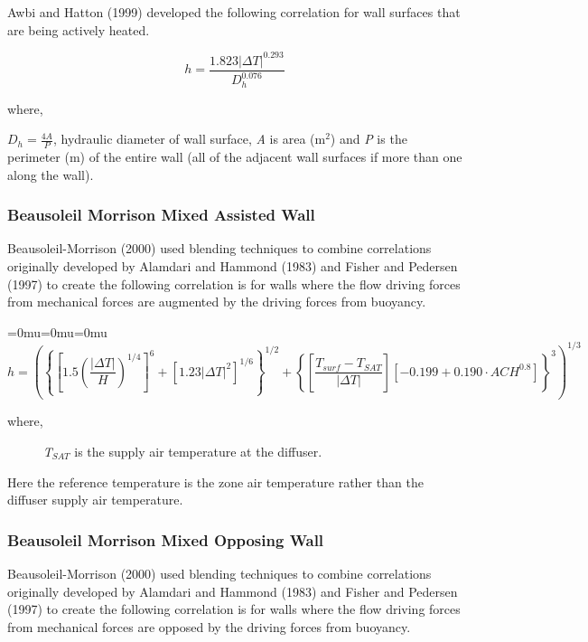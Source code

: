 Awbi and Hatton (1999) developed the following correlation for wall surfaces that are being actively heated.

\begin{equation}
h = \frac{{1.823{{\left| {\Delta T} \right|}^{0.293}}}}{{D_h^{0.076}}}
\end{equation}

where,

\({D_h} = \frac{{4A}}{P}\), hydraulic diameter of wall surface, \emph{A} is area (m\(^{2}\)) and \emph{P} is the perimeter (m) of the entire wall (all of the adjacent wall surfaces if more than one along the wall).

\subsubsection{Beausoleil Morrison Mixed Assisted Wall}\label{beausoleil-morrison-mixed-assisted-wall}

Beausoleil-Morrison (2000) used blending techniques to combine correlations originally developed by Alamdari and Hammond (1983) and Fisher and Pedersen (1997) to create the following correlation is for walls where the flow driving forces from mechanical forces are augmented by the driving forces from buoyancy.

{\medmuskip=0mu\thinmuskip=0mu\thickmuskip=0mu\nulldelimiterspace=0pt\scriptspace=0pt
\begin{equation}
h = \left(
\left\{
\left[1.5\left(\frac{\left|\Delta T\right|}{H}\right)^{1/4}\right]^6 +
\left[1.23\left|\Delta T\right|^2\right]^{1/6}
\right\}^{1/2} +
\left\{
\left[\frac{T_{surf}-T_{SAT}}{\left|\Delta T\right|}\right]
\left[-0.199+0.190\cdot ACH^{0.8}\right]
\right\}^3
\right)^{1/3}
\end{equation}}

where,

~~~~~ \emph{T\(_{SAT}\)} is the supply air temperature at the diffuser.

Here the reference temperature is the zone air temperature rather than the diffuser supply air temperature.

\subsubsection{Beausoleil Morrison Mixed Opposing Wall}\label{beausoleil-morrison-mixed-opposing-wall}

Beausoleil-Morrison (2000) used blending techniques to combine correlations originally developed by Alamdari and Hammond (1983) and Fisher and Pedersen (1997) to create the following correlation is for walls where the flow driving forces from mechanical forces are opposed by the driving forces from buoyancy.

